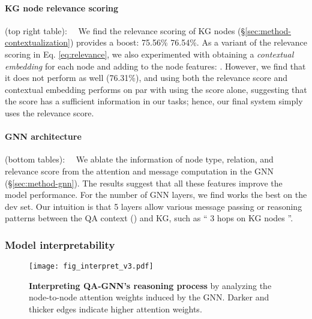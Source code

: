 \documentclass[11pt]{article}
\newcommand{\methodname}{QA-GNN\xspace}
\begin{document}
\paragraph{KG node relevance scoring}\!\!\!\!(top right table):~~
We find the relevance scoring of KG nodes (\S \ref{sec:method-contextualization}) provides a boost: 75.56\%  76.54\%.
As a variant of the relevance scoring in Eq.\! \ref{eq:relevance}, we also experimented with obtaining a \emph{contextual embedding}  for each node  and adding to the node features:
.
However, we find that it does not perform as well (76.31\%), and
using both the relevance score and contextual embedding performs on par with using the score alone, suggesting that the score has a sufficient information in our tasks; hence, our final system simply uses the relevance score.



\paragraph{GNN architecture}\!\!\!\!(bottom tables):~~ We ablate the information of node type, relation, and relevance score from the attention and message computation in the GNN (\S \ref{sec:method-gnn}). The results suggest that all these features improve the model performance. 
For the number of GNN layers, we find  works the best on the dev set. Our intuition is that 5 layers allow various message passing or reasoning patterns between the QA context () and KG, such as ``  3 hops on KG nodes  ''.


\subsubsection{Model interpretability}
\begin{figure}[!t]
\hspace{-1mm}
    \centering \texttt{[image: fig\_interpret\_v3.pdf]}
\caption{\textbf{Interpreting \methodname's reasoning process} by analyzing the node-to-node attention weights induced by the GNN. Darker and thicker edges indicate higher attention weights.
    }
\label{fig:interpret}
\end{figure}
\end{document}
